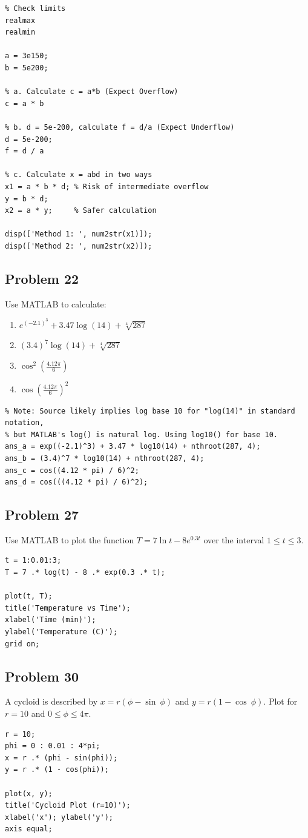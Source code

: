 \documentclass[DIN, pagenumber=false, fontsize=11pt, parskip=half]{scrartcl}
\newcommand{\myproblem}[1]{\subsection*{#1}}
\begin{document}
\begin{lstlisting}
% Check limits
realmax
realmin

a = 3e150;
b = 5e200;

% a. Calculate c = a*b (Expect Overflow)
c = a * b 

% b. d = 5e-200, calculate f = d/a (Expect Underflow)
d = 5e-200;
f = d / a

% c. Calculate x = abd in two ways
x1 = a * b * d; % Risk of intermediate overflow
y = b * d;      
x2 = a * y;     % Safer calculation

disp(['Method 1: ', num2str(x1)]);
disp(['Method 2: ', num2str(x2)]);
\end{lstlisting}

\myproblem{Problem 22}
Use MATLAB to calculate:
\begin{enumerate}
    \item[a.] $e^{(-2.1)^{3}}+3.47\log(14)+\sqrt[4]{287}$
    \item[b.] $(3.4)^{7}\log(14)+\sqrt[4]{287}$
    \item[c.] $\cos^{2}(\frac{4.12\pi}{6})$
    \item[d.] $\cos(\frac{4.12\pi}{6})^{2}$
\end{enumerate}

\begin{lstlisting}
% Note: Source likely implies log base 10 for "log(14)" in standard notation,
% but MATLAB's log() is natural log. Using log10() for base 10.
ans_a = exp((-2.1)^3) + 3.47 * log10(14) + nthroot(287, 4);
ans_b = (3.4)^7 * log10(14) + nthroot(287, 4);
ans_c = cos((4.12 * pi) / 6)^2;
ans_d = cos(((4.12 * pi) / 6)^2);
\end{lstlisting}

\myproblem{Problem 27}
Use MATLAB to plot the function $T=7 \ln t-8e^{0.3t}$ over the interval $1\le t\le3$.

\begin{lstlisting}
t = 1:0.01:3; 
T = 7 .* log(t) - 8 .* exp(0.3 .* t);

plot(t, T);
title('Temperature vs Time');
xlabel('Time (min)');        
ylabel('Temperature (C)');   
grid on;
\end{lstlisting}

\myproblem{Problem 30}
A cycloid is described by $x=r(\phi-\sin~\phi)$ and $y=r(1-\cos~\phi)$. Plot for $r=10$ and $0\le\phi\le4\pi$.

\begin{lstlisting}
r = 10;
phi = 0 : 0.01 : 4*pi; 
x = r .* (phi - sin(phi));
y = r .* (1 - cos(phi));

plot(x, y);
title('Cycloid Plot (r=10)');
xlabel('x'); ylabel('y');
axis equal; 
\end{lstlisting}
\end{document}
